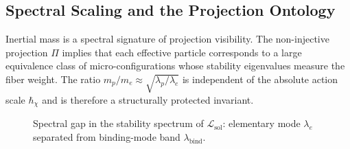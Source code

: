 \subsection{Spectral Scaling and the Projection Ontology}
\label{subsec:spectral-scaling-projection-ontology}

Inertial mass is a spectral signature of projection visibility.
The non-injective projection $\Pi$ implies that each effective particle
corresponds to a large equivalence class of micro-configurations whose
stability eigenvalues measure the fiber weight.
The ratio
$m_p/m_e \approx \sqrt{\lambda_p/\lambda_e}$
is independent of the absolute action scale $\hbar_\chi$ and is
therefore a structurally protected invariant.

\begin{figure}[htbp]
  \centering
  \caption{Spectral gap in the stability spectrum of
    $\mathcal{L}_{\mathrm{sol}}$: elementary mode
    $\lambda_e$ separated from binding-mode band
    $\lambda_{\mathrm{bind}}$.}
  \label{fig:spectral-gap}
\end{figure}
